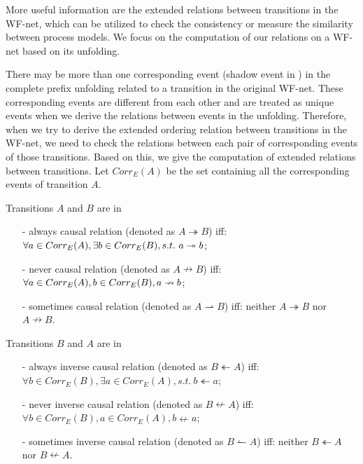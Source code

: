 \documentclass[dvips,...]{llncs}
\begin{document}
More useful information are the extended relations between transitions in the WF-net, which can be utilized to check the consistency or measure the similarity between process models. We focus on the computation of our relations on a WF-net based on its unfolding.

There may be more than one corresponding event (shadow event in \cite{wang2013efficient}) in the complete prefix unfolding related to a transition in the original WF-net. These corresponding events are different from each other and are treated as unique events when we derive the relations between events in the unfolding. Therefore, when we try to derive the extended ordering relation between transitions in the WF-net, we need to check the relations between each pair of corresponding events of those transitions. Based on this, we give the computation of extended relations between transitions. Let $Corr_{E}(A)$ be the set containing all the corresponding events of transition $A$.

\begin{definition}\label{def:causalRelations}
Transitions $A$ and $B$ are in
	\begin{itemize}
		\item[-] always causal relation (denoted as $A\twoheadrightarrow B$) iff: $\forall a\in Corr_{E}(A), \exists b\in Corr_{E}(B),\\s.t.~a\twoheadrightarrow b$;
		\item[-] never causal relation (denoted as $A\nrightarrow B$) iff: $\forall a\in Corr_{E}(A), b\in Corr_{E}(B),\\a\nrightarrow b$;
		\item[-] sometimes causal relation (denoted as $A\rightharpoonup B$) iff: neither $A\twoheadrightarrow B$ nor $A\nrightarrow B$.
	\end{itemize}
\end{definition}

\begin{definition}\label{def:inverseCausalRelations}
Transitions $B$ and $A$ are in
	\begin{itemize}
		\item[-] always inverse causal relation (denoted as $B\twoheadleftarrow A$) iff: $\forall b\in Corr_{E}(B), \exists a\in Corr_{E}(A), s.t.~b\twoheadleftarrow a$;
		\item[-] never inverse causal relation (denoted as $B\nleftarrow A$) iff: $\forall b\in Corr_{E}(B), a\in Corr_{E}(A), b\nleftarrow a$;
		\item[-] sometimes inverse causal relation (denoted as $B\leftharpoonup A$) iff: neither $B\twoheadleftarrow A$ nor $B\nleftarrow A$.
	\end{itemize}
\end{definition}
\end{document}

